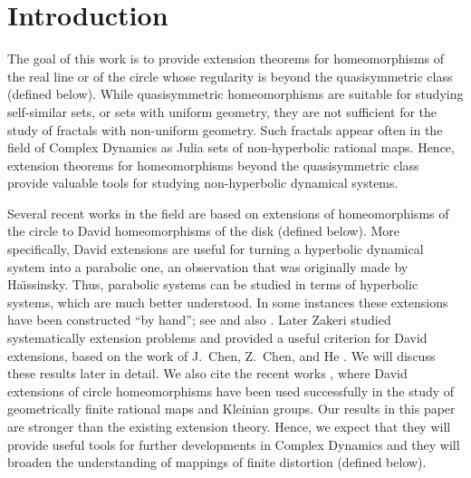 \documentclass{amsart}
\theoremstyle{plain}
\theoremstyle{definition}
\theoremstyle{remark}
\numberwithin{equation}{section}
\numberwithin{theorem}{section}
\numberwithin{conjecture}{section}
\newcommand{\1}{\mathbf 1}
\begin{document}
\section{Introduction}

The goal of this work is to provide extension theorems for homeomorphisms of the real line or of the circle whose regularity is beyond the quasisymmetric class (defined below). While quasisymmetric homeomorphisms are suitable for studying self-similar sets, or sets with uniform geometry, they are not sufficient for the study of fractals with non-uniform geometry. Such fractals appear often in the field of Complex Dynamics as Julia sets of non-hyperbolic rational maps. Hence, extension theorems for homeomorphisms beyond the quasisymmetric class provide valuable tools for studying non-hyperbolic dynamical systems. 

Several recent works in the field are based on extensions of homeomorphisms of the circle to David homeomorphisms of the disk (defined below). More specifically, David extensions are useful for turning a hyperbolic dynamical system into a parabolic one, an observation that was originally made by Ha\"{\i}ssinsky. Thus, parabolic systems can be studied in terms of hyperbolic systems, which are much better understood. In some instances these extensions have been constructed ``by hand''; see \cite{Haissinsky:parabolic, PetersenZakeri:Siegel} and also \cite[Chapter 9]{BrannerFagella:surgery}. Later Zakeri \cite{Zakeri:boundary} studied systematically extension problems and provided a useful criterion for David extensions, based on the work of J.\ Chen, Z.\ Chen, and He \cite{ChenChenHe:boundary}. We will discuss these results later in detail. We also cite the recent works \cite{LodgeLyubichMerenkovMukherjee:gaskets, LyubichMerenkovMukherjeeNtalampekos:David}, where David extensions of circle homeomorphisms have been used successfully in the study of geometrically finite rational maps and Kleinian groups.  Our results in this paper are stronger than the existing extension theory. Hence, we expect that they will provide useful tools for further developments in Complex Dynamics and they will broaden the understanding of mappings of finite distortion (defined below). 
\end{document}
